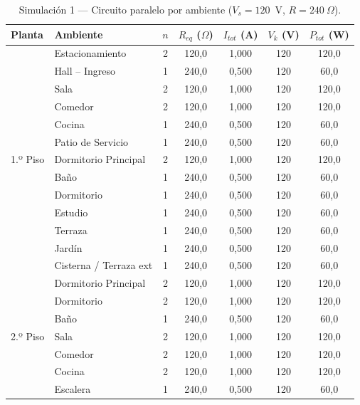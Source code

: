 \begin{table}[H]
\centering
\caption{Simulación 1 — Circuito paralelo por ambiente ($V_s = 120$~V, $R = 240~\Omega$).}
\label{tab:sim_paralelo}
\begin{tabular}{llccccc}
\toprule
\textbf{Planta} & \textbf{Ambiente} & \textbf{$n$} & \textbf{$R_{eq}$ ($\Omega$)} & \textbf{$I_{tot}$ (A)} & \textbf{$V_k$ (V)} & \textbf{$P_{tot}$ (W)} \\
\midrule
\multirow{13}{*}{1.º Piso}
 & Estacionamiento        & 2 & 120{,}0 & 1{,}000 & 120 & 120{,}0 \\
 & Hall – Ingreso         & 1 & 240{,}0 & 0{,}500 & 120 &  60{,}0 \\
 & Sala                   & 2 & 120{,}0 & 1{,}000 & 120 & 120{,}0 \\
 & Comedor                & 2 & 120{,}0 & 1{,}000 & 120 & 120{,}0 \\
 & Cocina                 & 1 & 240{,}0 & 0{,}500 & 120 &  60{,}0 \\
 & Patio de Servicio      & 1 & 240{,}0 & 0{,}500 & 120 &  60{,}0 \\
 & Dormitorio Principal   & 2 & 120{,}0 & 1{,}000 & 120 & 120{,}0 \\
 & Baño                   & 1 & 240{,}0 & 0{,}500 & 120 &  60{,}0 \\
 & Dormitorio             & 1 & 240{,}0 & 0{,}500 & 120 &  60{,}0 \\
 & Estudio                & 1 & 240{,}0 & 0{,}500 & 120 &  60{,}0 \\
 & Terraza                & 1 & 240{,}0 & 0{,}500 & 120 &  60{,}0 \\
 & Jardín                 & 1 & 240{,}0 & 0{,}500 & 120 &  60{,}0 \\
 & Cisterna / Terraza ext & 1 & 240{,}0 & 0{,}500 & 120 &  60{,}0 \\
\midrule
\multirow{8}{*}{2.º Piso}
 & Dormitorio Principal   & 2 & 120{,}0 & 1{,}000 & 120 & 120{,}0 \\
 & Dormitorio             & 2 & 120{,}0 & 1{,}000 & 120 & 120{,}0 \\
 & Baño                   & 1 & 240{,}0 & 0{,}500 & 120 &  60{,}0 \\
 & Sala                   & 2 & 120{,}0 & 1{,}000 & 120 & 120{,}0 \\
 & Comedor                & 2 & 120{,}0 & 1{,}000 & 120 & 120{,}0 \\
 & Cocina                 & 2 & 120{,}0 & 1{,}000 & 120 & 120{,}0 \\
 & Escalera               & 1 & 240{,}0 & 0{,}500 & 120 &  60{,}0 \\

\end{tabular}
\end{table}
